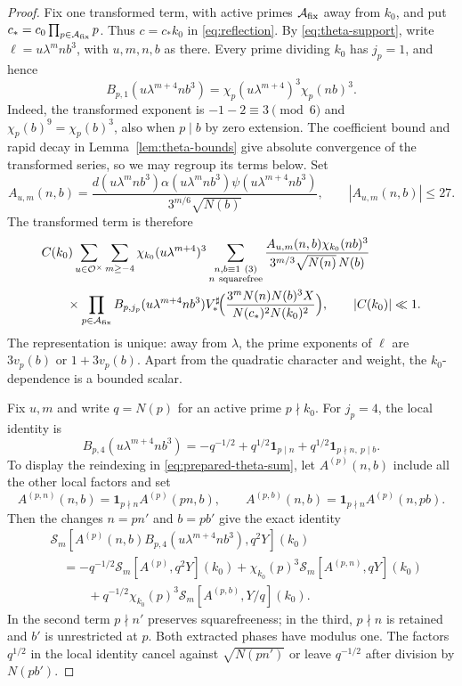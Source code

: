 \documentclass[11pt,a4paper]{article}
\numberwithin{equation}{section}
\numberwithin{figure}{section}
\theoremstyle{definition}
\theoremstyle{remark}
\newcommand{\OO}{\mathcal O}
\newcommand{\ind}{\mathbf1}
\begin{document}
\begin{proof}
Fix one transformed term, with active primes $\mathcal A_{\rm fix}$
away from $k_0$, and put $c_*=c_0\prod_{p\in\mathcal A_{\rm fix}}p$.
Thus $c=c_*k_0$ in \eqref{eq:reflection}.
By \eqref{eq:theta-support}, write $\ell=u\lambda^mnb^3$,
with $u,m,n,b$ as there.
Every prime dividing $k_0$ has $j_p=1$, and hence
\begin{equation}\label{eq:residual-quadratic-factor}
 B_{p,1}(u\lambda^{m+4}nb^3)
 =\chi_p(u\lambda^{m+4})^3\chi_p(nb)^3.
\end{equation}
Indeed, the transformed exponent is $-1-2\equiv3\pmod6$ and
$\chi_p(b)^9=\chi_p(b)^3$, also when $p\mid b$ by zero extension.
The coefficient bound and rapid decay in Lemma~\ref{lem:theta-bounds}
give absolute convergence of the transformed series, so we may regroup
its terms below. Set
\[
 A_{u,m}(n,b)=
 \frac{d(u\lambda^mnb^3)\alpha(u\lambda^mnb^3)
       \psi(u\lambda^{m+4}nb^3)}{3^{m/6}\sqrt{N(b)}},
 \qquad |A_{u,m}(n,b)|\le27.
\]
The transformed term is therefore
\[
 \begin{aligned}
 &C(k_0)\sum_{u\in\OO^\times}\sum_{m\ge-4}
 \chi_{k_0}(u\lambda^{m+4})^3
 \sum_{\substack{n,b\equiv1\ (3)\\n\ {\rm squarefree}}}
 \frac{A_{u,m}(n,b)\chi_{k_0}(nb)^3}
      {3^{m/3}\sqrt{N(n)}\,N(b)}\\
 &\qquad\times\prod_{p\in\mathcal A_{\rm fix}}
 B_{p,j_p}(u\lambda^{m+4}nb^3)
 V_*^\sharp\!\Bigl(\frac{3^mN(n)N(b)^3X}
 {N(c_*)^2N(k_0)^2}\Bigr),\qquad |C(k_0)|\ll1.
 \end{aligned}
\]
The representation is unique: away from $\lambda$, the prime
exponents of $\ell$ are $3v_p(b)$ or $1+3v_p(b)$. Apart from the
quadratic character and weight, the $k_0$-dependence is a bounded scalar.

Fix $u,m$ and write $q=N(p)$ for an active prime $p\nmid k_0$.
For $j_p=4$, the local identity is
\[
 B_{p,4}(u\lambda^{m+4}nb^3)
 =-q^{-1/2}+q^{1/2}\ind_{p\mid n}
              +q^{1/2}\ind_{p\nmid n,\ p\mid b}.
\]
To display the reindexing in \eqref{eq:prepared-theta-sum}, let
$A^{(p)}(n,b)$ include all the other local factors and set
\[
 A^{(p,n)}(n,b)=\ind_{p\nmid n}A^{(p)}(pn,b),\qquad
 A^{(p,b)}(n,b)=\ind_{p\nmid n}A^{(p)}(n,pb).
\]
Then the changes $n=pn'$ and $b=pb'$ give the exact identity
\[
 \begin{aligned}
 &\mathscr S_m[A^{(p)}(n,b)B_{p,4}(u\lambda^{m+4}nb^3),q^2Y](k_0)\\
 &\quad=-q^{-1/2}\mathscr S_m[A^{(p)},q^2Y](k_0)
 +\chi_{k_0}(p)^3\mathscr S_m[A^{(p,n)},qY](k_0)\\
 &\qquad\quad+q^{-1/2}\chi_{k_0}(p)^3
              \mathscr S_m[A^{(p,b)},Y/q](k_0).
 \end{aligned}
\]
In the second term $p\nmid n'$ preserves squarefreeness; in the
third, $p\nmid n$ is retained and $b'$ is unrestricted at $p$.
Both extracted phases have modulus one. The factors $q^{1/2}$
in the local identity cancel against $\sqrt{N(pn')}$ or leave
$q^{-1/2}$ after division by $N(pb')$.


\end{proof}
\end{document}
